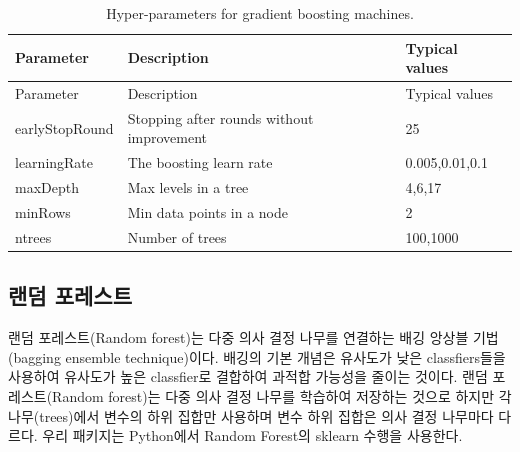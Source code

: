 \documentclass[11pt]{book}
\theoremstyle{definition}
\theoremstyle{definition}
\theoremstyle{definition}
\theoremstyle{remark}
\begin{document}
\begin{longtable}[]{@{}lll@{}}
\caption{\label{tab:gbmParameters} Hyper-parameters for gradient boosting
machines.}\tabularnewline
\toprule
Parameter & Description & Typical values\tabularnewline
\midrule
\endfirsthead
\toprule
Parameter & Description & Typical values\tabularnewline
\midrule
\endhead
earlyStopRound & Stopping after rounds without improvement &
25\tabularnewline
learningRate & The boosting learn rate & 0.005,0.01,0.1\tabularnewline
maxDepth & Max levels in a tree & 4,6,17\tabularnewline
minRows & Min data points in a node & 2\tabularnewline
ntrees & Number of trees & 100,1000\tabularnewline
\bottomrule
\end{longtable}

\subsection{랜덤 포레스트}\label{-}

랜덤 포레스트(Random forest)는 다중 의사 결정 나무를 연결하는 배깅
앙상블 기법(bagging ensemble technique)이다. 배깅의 기본 개념은 유사도가
낮은 classfiers들을 사용하여 유사도가 높은 classfier로 결합하여 과적합
가능성을 줄이는 것이다. 랜덤 포레스트(Random forest)는 다중 의사 결정
나무를 학습하여 저장하는 것으로 하지만 각 나무(trees)에서 변수의 하위
집합만 사용하며 변수 하위 집합은 의사 결정 나무마다 다르다. 우리
패키지는 Python에서 Random Forest의 sklearn 수행을 사용한다.
  
\end{document}
